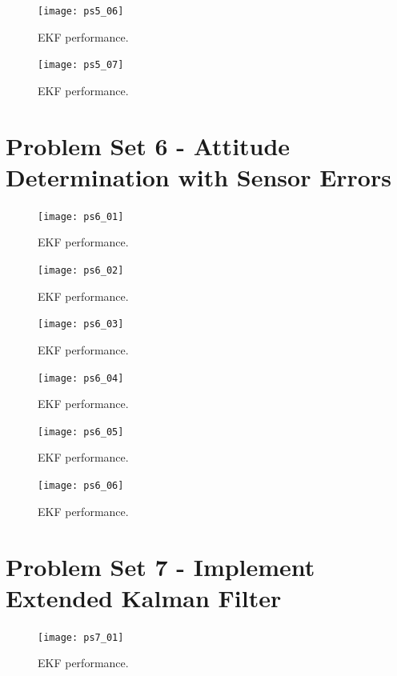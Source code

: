 \documentclass[12pt, letterpaper]{article}
\begin{document}
\begin{figure}[H]
	\centering
	\texttt{[image: ps5\_06]}
	\caption{EKF performance.}
	\label{5:ekf}
\end{figure}


\begin{figure}[H]
	\centering
	\texttt{[image: ps5\_07]}
	\caption{EKF performance.}
	\label{5:ekf}
\end{figure}

\section{Problem Set 6 - Attitude Determination with Sensor Errors}



\begin{figure}[H]
	\centering
	\texttt{[image: ps6\_01]}
	\caption{EKF performance.}
	\label{6:ekf}
\end{figure}


\begin{figure}[H]
	\centering
	\texttt{[image: ps6\_02]}
	\caption{EKF performance.}
	\label{6:ekf}
\end{figure}


\begin{figure}[H]
	\centering
	\texttt{[image: ps6\_03]}
	\caption{EKF performance.}
	\label{6:ekf}
\end{figure}


\begin{figure}[H]
	\centering
	\texttt{[image: ps6\_04]}
	\caption{EKF performance.}
	\label{6:ekf}
\end{figure}


\begin{figure}[H]
	\centering
	\texttt{[image: ps6\_05]}
	\caption{EKF performance.}
	\label{6:ekf}
\end{figure}


\begin{figure}[H]
	\centering
	\texttt{[image: ps6\_06]}
	\caption{EKF performance.}
	\label{6:ekf}
\end{figure}




\section{Problem Set 7 - Implement Extended Kalman Filter}



\begin{figure}[H]
	\centering
	\texttt{[image: ps7\_01]}
	\caption{EKF performance.}
	\label{7:ekf}
\end{figure}
\end{document}
